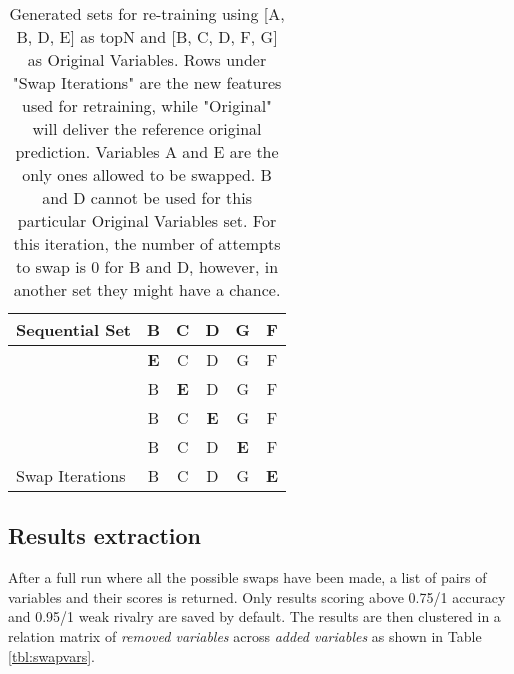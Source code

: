 \begin{table}[!htbp]
{\begin{tabular}{l|c|c|c|c|c|}
\multicolumn{1}{|l|}{Sequential Set}                          & B                                  & C                                  & D                                  & G                                  & F                                  \\ \hline
\multicolumn{1}{|l|}{}                                  & \cellcolor[HTML]{68CBD0}\textbf{E} & \cellcolor[HTML]{F1F8F6}C          & \cellcolor[HTML]{F1F8F6}D          & \cellcolor[HTML]{F1F8F6}G          & \cellcolor[HTML]{F1F8F6}F          \\ \cline{2-6} 
\multicolumn{1}{|l|}{}                                  & B                                  & \cellcolor[HTML]{68CBD0}\textbf{E} & D                                  & G                                  & F                                  \\ \cline{2-6} 
\multicolumn{1}{|l|}{}                                  & \cellcolor[HTML]{F1F8F6}B          & \cellcolor[HTML]{F1F8F6}C          & \cellcolor[HTML]{68CBD0}\textbf{E} & \cellcolor[HTML]{F1F8F6}G          & \cellcolor[HTML]{F1F8F6}F          \\ \cline{2-6} 
\multicolumn{1}{|l|}{}                                  & B                                  & C                                  & D                                  & \cellcolor[HTML]{68CBD0}\textbf{E} & F                                  \\ \cline{2-6} 
\multicolumn{1}{|l|}{\multirow{-5}{*}{Swap Iterations}} & \cellcolor[HTML]{F1F8F6}B          & \cellcolor[HTML]{F1F8F6}C          & \cellcolor[HTML]{F1F8F6}D          & \cellcolor[HTML]{F1F8F6}G          & \cellcolor[HTML]{68CBD0}\textbf{E} \\ \hline
\end{tabular}%
}
\label{tbl:swap-example}
\caption{Generated sets for re-training using [A, B, D, E] as topN and [B, C, D, F, G] as Original Variables. Rows under "Swap Iterations" are the new features used for retraining, while "Original" will deliver the reference original prediction. Variables A and E are the only ones allowed to be swapped. B and D cannot be used for this particular Original Variables set. For this iteration, the number of attempts to swap is 0 for B and D, however, in another set they might have a chance.}
\end{table}

\subsection{Results extraction}
After a full run where all the possible swaps have been made, a list of pairs of variables and their scores is returned. Only results scoring above 0.75/1 accuracy and 0.95/1 weak rivalry are saved by default. The results are then clustered in a relation matrix of \textit{removed variables} across \textit{added variables} as shown in Table \ref{tbl:swapvars}. 
\\


